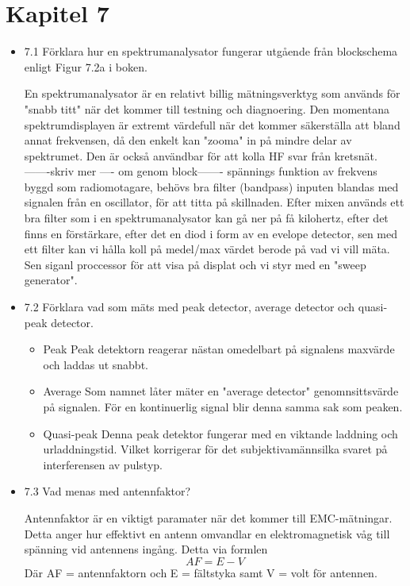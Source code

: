 \documentclass{article}
\begin{document}
\section{Kapitel 7}

\begin{itemize}
    \item 7.1 Förklara hur en spektrumanalysator fungerar utgående från blockschema enligt Figur 7.2a i boken.

    En spektrumanalysator är en relativt billig mätningsverktyg som används för "snabb titt" när det kommer till testning och diagnoering. Den momentana spektrumdisplayen är extremt värdefull när det kommer säkerställa att bland annat frekvensen, då den enkelt kan "zooma" in på mindre delar av spektrumet. Den är också användbar för att kolla HF svar från kretsnät.  
    -------skriv mer ---- om genom block-------
    spännings funktion av frekvens
    byggd som radiomotagare,  behövs bra filter (bandpass)
    inputen blandas med signalen från en oscillator, för att titta på skillnaden. Efter mixen används ett bra filter som i en spektrumanalysator kan gå ner på få kilohertz, efter det finns en förstärkare, efter det en diod i form av en evelope detector, sen med ett filter kan vi hålla koll på medel/max värdet berode på vad vi vill mäta. Sen siganl proccessor för att visa på displat och vi styr med en "sweep generator". 

\item 7.2 Förklara vad som mäts med peak detector, average detector och quasi‐peak detector.

\begin{itemize}
    \item Peak
    Peak detektorn reagerar nästan omedelbart på signalens maxvärde och laddas ut snabbt. 

    \item Average
    Som namnet låter mäter en "average detector" genomnsittsvärde på signalen. För en kontinuerlig signal blir denna samma sak som peaken. 

    \item Quasi-peak
    Denna peak detektor fungerar med en viktande laddning och urladdningstid. Vilket korrigerar för det subjektivamännsilka svaret på interferensen av pulstyp. 
    
\end{itemize}

\item 7.3 Vad menas med antennfaktor?

Antennfaktor är en viktigt paramater när det kommer till EMC-mätningar. Detta anger hur effektivt en antenn omvandlar en elektromagnetisk våg till spänning vid antennens ingång. Detta via formlen \[AF=E-V\] Där AF = antennfaktorn och E = fältstyka samt V = volt för antennen.


\end{itemize}
\end{document}
